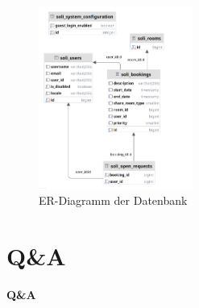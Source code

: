 \documentclass{sdqbeamer}
\begin{document}
\begin{frame}[plain]
    \begin{figure}
        \centering
        \includegraphics[width=0.45\textwidth]{pictures/figures/database}
        \caption{ER-Diagramm der Datenbank}
        \label{fig:er-diagram}
    \end{figure}

\end{frame}

\section{Q\&A}

\begin{frame}
    \centering
    \Huge \textbf{Q\&A}
\end{frame}
\end{document}
